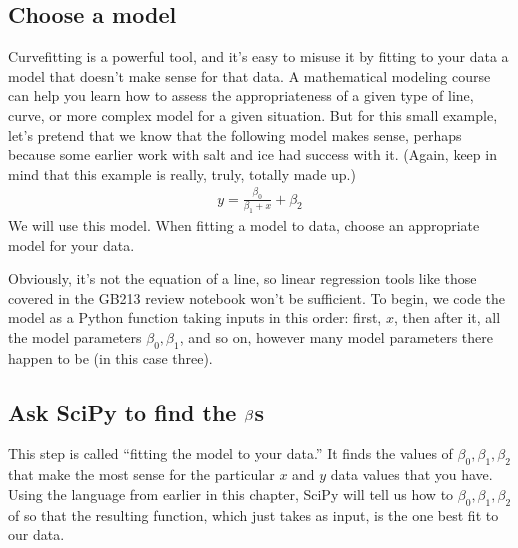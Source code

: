 \documentclass[letterpaper,10pt,english]{jupyterBook}
\begin{document}
\subsection{Choose a model}
\label{\detokenize{chapter-9-math-and-stats:choose-a-model}}
\sphinxAtStartPar
Curve\sphinxhyphen{}fitting is a powerful tool, and it’s easy to misuse it by fitting to your data a model that doesn’t make sense for that data.  A mathematical modeling course can help you learn how to assess the appropriateness of a given type of line, curve, or more complex model for a given situation.  But for this small example, let’s pretend that we know that the following model makes sense, perhaps because some earlier work with salt and ice had success with it.  (Again, keep in mind that this example is really, truly, totally made up.)
\begin{equation*}
\begin{split} y=\frac{\beta_0}{\beta_1+x}+\beta_2 \end{split}
\end{equation*}
\sphinxAtStartPar
We will use this model.    When fitting a model to data, choose an appropriate model for your data.

\sphinxAtStartPar
Obviously, it’s not the equation of a line, so linear regression tools like those covered in the GB213 review notebook won’t be sufficient.  To begin, we code the model as a Python function taking inputs in this order: first, \(x\), then after it, all the model parameters \(\beta_0,\beta_1\), and so on, however many model parameters there happen to be (in this case three).

\begin{sphinxVerbatim}[commandchars=\\\{\}]
       
             
\end{sphinxVerbatim}


\subsection{Ask SciPy to find the \protect\(\beta\protect\)s}
\label{\detokenize{chapter-9-math-and-stats:ask-scipy-to-find-the-betas}}
\sphinxAtStartPar
This step is called “fitting the model to your data.”  It finds the values of \(\beta_0,\beta_1,\beta_2\) that make the most sense for the particular \(x\) and \(y\) data values that you have.  Using the language from earlier in this chapter, SciPy will tell us how to  \(\beta_0,\beta_1,\beta_2\) of  so that the resulting function, which just takes  as input, is the one best fit to our data.
\end{document}
